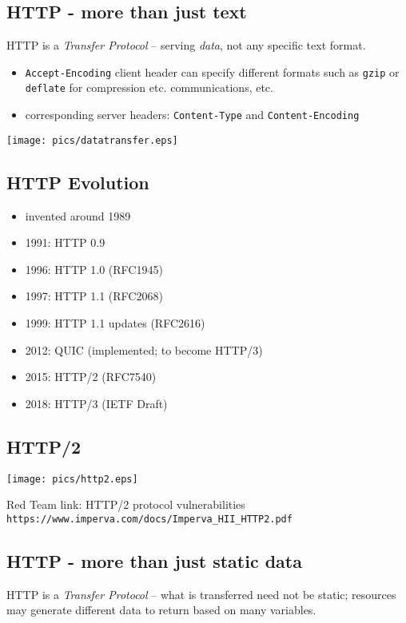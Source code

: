 \documentclass[xga]{xdvislides}
\begin{document}
\subsection{HTTP - more than just text}
HTTP is a {\em Transfer Protocol} -- serving {\em data}, not any specific
text format.

\begin{itemize}
	\item {\tt Accept-Encoding} client header can specify different formats
		such as {\tt gzip} or {\tt deflate} for compression etc.
		communications, etc.
	\item corresponding server headers: {\tt Content-Type} and
		{\tt Content-Encoding}
\end{itemize}
\begin{center}
	\texttt{[image: pics/datatransfer.eps]}
\end{center}

\subsection{HTTP Evolution}
\begin{itemize}
	\item invented around 1989
	\item 1991: HTTP 0.9
	\item 1996: HTTP 1.0 (RFC1945)
	\item 1997: HTTP 1.1 (RFC2068)
	\item 1999: HTTP 1.1 updates (RFC2616)
	\item 2012: QUIC (implemented; to become HTTP/3)
	\item 2015: HTTP/2 (RFC7540)
	\item 2018: HTTP/3 (IETF Draft)
\end{itemize}

\subsection{HTTP/2}
\begin{center}
	\texttt{[image: pics/http2.eps]}
\end{center}
\vspace{.5in}
Red Team link: HTTP/2 protocol vulnerabilities \\
\verb+https://www.imperva.com/docs/Imperva_HII_HTTP2.pdf+

\subsection{HTTP - more than just static data}
HTTP is a {\em Transfer Protocol} -- what is transferred need not be
static; resources may generate different data to return based on many
variables.
\end{document}
